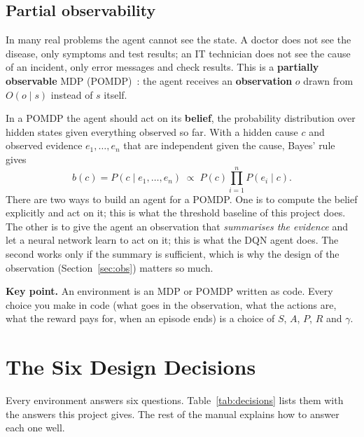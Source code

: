 \documentclass[11pt,a4paper]{article}
\newcommand{\keypoint}[1]{\par\noindent\colorbox{notebg}{\parbox{\dimexpr\linewidth-2\fboxsep}{\small\textbf{Key point.} #1}}\par}
\begin{document}
\subsection{Partial observability}
In many real problems the agent cannot see the state. A doctor does not see the disease, only symptoms and test results; an IT technician does not see the cause of an incident, only error messages and check results. This is a \textbf{partially observable} MDP (POMDP)~\cite{kaelbling}: the agent receives an \textbf{observation} $o$ drawn from $O(o \mid s)$ instead of $s$ itself.

In a POMDP the agent should act on its \textbf{belief}, the probability distribution over hidden states given everything observed so far. With a hidden cause $c$ and observed evidence $e_1, \dots, e_n$ that are independent given the cause, Bayes' rule gives
\begin{equation}
b(c) = P(c \mid e_1, \dots, e_n) \;\propto\; P(c) \prod_{i=1}^{n} P(e_i \mid c).
\label{eq:belief}
\end{equation}
There are two ways to build an agent for a POMDP. One is to compute the belief explicitly and act on it; this is what the threshold baseline of this project does. The other is to give the agent an observation that \emph{summarises the evidence} and let a neural network learn to act on it; this is what the DQN agent does. The second works only if the summary is sufficient, which is why the design of the observation (Section~\ref{sec:obs}) matters so much.

\keypoint{An environment is an MDP or POMDP written as code. Every choice you make in code (what goes in the observation, what the actions are, what the reward pays for, when an episode ends) is a choice of $S$, $A$, $P$, $R$ and $\gamma$.}

\section{The Six Design Decisions}

Every environment answers six questions. Table~\ref{tab:decisions} lists them with the answers this project gives. The rest of the manual explains how to answer each one well.
\end{document}
